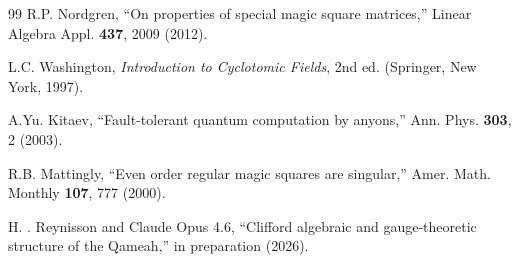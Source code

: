 \documentclass[aip,jmp,reprint,superscriptaddress,floatfix,nofootinbib]{revtex4-2}
\theoremstyle{definition}
\theoremstyle{remark}
\begin{document}
\begin{thebibliography}{99}
 R.P. Nordgren, ``On properties of special magic square
matrices,'' Linear Algebra Appl. \textbf{437}, 2009 (2012).

 L.C. Washington, \textit{Introduction to Cyclotomic
Fields}, 2nd ed. (Springer, New York, 1997).

 A.Yu. Kitaev, ``Fault-tolerant quantum computation by
anyons,'' Ann. Phys. \textbf{303}, 2 (2003).

 R.B. Mattingly, ``Even order regular magic squares are
singular,'' Amer. Math. Monthly \textbf{107}, 777 (2000).

 H. \TH. Reynisson and Claude Opus 4.6,
``Clifford algebraic and gauge-theoretic structure of the Qameah,''
in preparation (2026).

\end{thebibliography}
\end{document}
